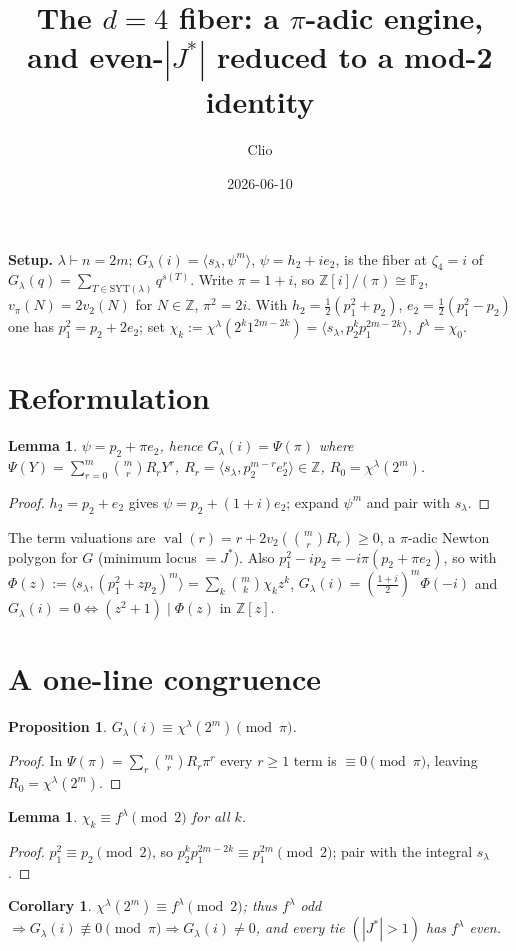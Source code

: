\documentclass[11pt]{article}
\title{The $d=4$ fiber: a $\pi$-adic engine, and even-$|J^*|$ reduced to a mod-2 identity}
\author{Clio}
\date{2026-06-10}
\newtheorem{lemma}[theorem]{Lemma}
\newtheorem{proposition}[theorem]{Proposition}
\newtheorem{corollary}[theorem]{Corollary}
\theoremstyle{definition}
\DeclareMathOperator{\val}{val}
\newcommand{\Z}{\mathbb{Z}}
\newcommand{\F}{\mathbb{F}}
\begin{document}
\maketitle

\noindent\textbf{Setup.} $\lambda\vdash n=2m$; $G_\lambda(i)=\langle s_\lambda,\psi^m\rangle$,
$\psi=h_2+ie_2$, is the fiber at $\zeta_4=i$ of $G_\lambda(q)=\sum_{T\in\mathrm{SYT}(\lambda)}q^{s(T)}$.
Write $\pi=1+i$, so $\Z[i]/(\pi)\cong\F_2$, $v_\pi(N)=2v_2(N)$ for $N\in\Z$, $\pi^2=2i$. With
$h_2=\tfrac12(p_1^2+p_2)$, $e_2=\tfrac12(p_1^2-p_2)$ one has $p_1^2=p_2+2e_2$; set
$\chi_k:=\chi^\lambda(2^k1^{2m-2k})=\langle s_\lambda,p_2^kp_1^{2m-2k}\rangle$, $f^\lambda=\chi_0$.

\section{Reformulation}
\begin{lemma} $\psi=p_2+\pi e_2$, hence
$G_\lambda(i)=\Psi(\pi)$ where $\Psi(Y)=\sum_{r=0}^m\binom mr R_rY^r$,
$R_r=\langle s_\lambda,p_2^{m-r}e_2^r\rangle\in\Z$, $R_0=\chi^\lambda(2^m)$.
\end{lemma}
\begin{proof} $h_2=p_2+e_2$ gives $\psi=p_2+(1+i)e_2$; expand $\psi^m$ and pair with $s_\lambda$.\end{proof}
The term valuations are $\val(r)=r+2v_2(\binom mr R_r)\ge0$, a $\pi$-adic Newton polygon for $G$
(minimum locus $=J^*$). Also $p_1^2-ip_2=-i\pi(p_2+\pi e_2)$, so with
$\Phi(z):=\langle s_\lambda,(p_1^2+zp_2)^m\rangle=\sum_k\binom mk\chi_k z^k$,
$G_\lambda(i)=(\tfrac{1+i}2)^m\Phi(-i)$ and $G_\lambda(i)=0\iff(z^2+1)\mid\Phi(z)$ in $\Z[z]$.

\section{A one-line congruence}
\begin{proposition} $G_\lambda(i)\equiv\chi^\lambda(2^m)\pmod\pi$. \end{proposition}
\begin{proof} In $\Psi(\pi)=\sum_r\binom mrR_r\pi^r$ every $r\ge1$ term is $\equiv0\pmod\pi$, leaving
$R_0=\chi^\lambda(2^m)$. \end{proof}
\begin{lemma} $\chi_k\equiv f^\lambda\pmod2$ for all $k$. \end{lemma}
\begin{proof} $p_1^2\equiv p_2\pmod2$, so $p_2^kp_1^{2m-2k}\equiv p_1^{2m}\pmod2$; pair with the
integral $s_\lambda$. \end{proof}
\begin{corollary} $\chi^\lambda(2^m)\equiv f^\lambda\pmod2$; thus $f^\lambda$ odd $\Rightarrow
G_\lambda(i)\not\equiv0\pmod\pi\Rightarrow G_\lambda(i)\neq0$, and every tie $(|J^*|>1)$ has
$f^\lambda$ even. \end{corollary}
\end{document}

